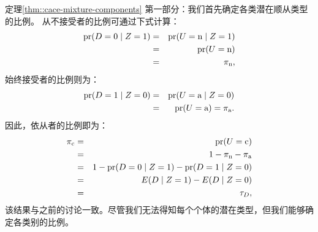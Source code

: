  
\begin{myproof}{定理}{\ref{thm::cace-mixture-components}}
第一部分：我们首先确定各类潜在顺从类型的比例。
 从不接受者的比例可通过下式计算：
\begin{eqnarray*}
\textup{pr}(D=0\mid Z=1) 
&=& \textup{pr}(U=\textup{n} \mid Z=1)  \\
&=& \textup{pr}(U=\textup{n}) \\
&=&  \pi_{\textup{n}} ,
\end{eqnarray*}
始终接受者的比例则为：
\begin{eqnarray*}
\textup{pr}(D=1\mid Z=0) 
&=& \textup{pr}(U=\textup{a} \mid Z=0)  \\
&=& \textup{pr}(U=\textup{a}) =  \pi_{\textup{a}} . 
\end{eqnarray*}
因此，依从者的比例即为：
\begin{eqnarray*}
\pi_{\textup{c}} &=& \textup{pr}(U=\textup{c}) \\
&=& 1-  \pi_{\textup{n}} -  \pi_{\textup{a}}  \\
&=& 1 - \textup{pr}(D=0\mid Z=1)  - \textup{pr}(D=1\mid Z=0) \\
&=& E(D\mid Z=1) - E(D\mid Z=0) \\
&=& \tau_D,
\end{eqnarray*}
该结果与之前的讨论一致。尽管我们无法得知每个个体的潜在类型，但我们能够确定各类别的比例。 



\end{myproof}
